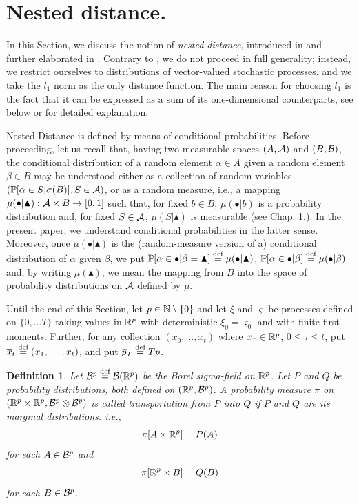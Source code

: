 \documentclass{article}              %
\newtheorem{definition}{Definition}
\begin{document}
\section{\label{sec:Nested}Nested distance.}

In this Section, we discuss the notion of {\em nested distance}, introduced
in \cite{pflug2012distance} and further elaborated in \cite{pflug2014multistage}.
Contrary to \cite{pflug2014multistage}, we do not proceed in full
generality; instead, we restrict ourselves to distributions of vector-valued
stochastic processes, and we take the $l_{1}$ norm as the only distance
function. The main reason for choosing $l_{1}$ is the fact that it can be expressed as a sum of its one-dimensional counterparts, see below or \cite{Smid09c} for detailed explanation.

Nested Distance is defined by means of conditional probabilities.
Before proceeding, let us recall that, having two measurable spaces $(A,\mathcal{A})$ and $(B,\mathcal{B})$, the conditional distribution of
a random element $\alpha\in A$ given a random element $\beta\in B$
may be understood either as a collection of random variables $(\mathbb{P}[\alpha\in S|\sigma(B)],S \in \mathcal{A})$, or as a random measure, i.e., a mapping $\mu(\bullet|\blacktriangle):\mathcal{A}\times B\rightarrow[0,1]$
such that, for fixed $b\in B$, $\mu(\bullet|b)$ is a probability
distribution and, for fixed $S\in\mathcal{A}$, $\mu(S|\blacktriangle)$ is
measurable (see \cite{Kallenberg02} Chap. 1.). In the present paper,
we understand conditional probabilities in the latter sense. Moreover, once
$\mu(\bullet|\blacktriangle)$ is the (random-measure version of a) conditional
distribution of $\alpha$ given $\beta$, we put $\mathbb{P}[\alpha\in\bullet|\beta=\blacktriangle]\stackrel{\text{\rm def}}{=}\mu(\bullet|\blacktriangle)$,
$\mathbb{P}[\alpha\in\bullet|\beta]\stackrel{\text{\rm def}}{=}\mu(\bullet|\beta)$ and, by writing
$\mu(\blacktriangle)$, we mean the mapping from $B$ into the
space of probability distributions on $\mathcal{A}$ defined by $\mu$.

Until the end of this Section, let $p\in\mathbb{N} \setminus \{0\}$ and let $\xi$ and $\varsigma$
be processes defined on $\{0,\dots T\}$ taking values in $\mathbb{R}^{p}$
with deterministic $\xi_{0}=\varsigma_{0}$  and with finite first
moments. Further, 
for any collection $(x_{0},\dots,x_{t})$ where $x_\tau \in \mathbb{R}^p$, $0\leq \tau \leq t$, put $\overline{x}_{t}\stackrel{\text{\rm def}}{=}(x_{1},\dots,x_{t})$, and put $\bar{p}_{T}\stackrel{\text{\rm def}}{=} Tp$.

\begin{definition} Let $\mathcal{B}^{p}\stackrel{\text{\rm def}}{=}\mathcal{B}(\mathbb{R}^{p})$ be the Borel
sigma-field on $\mathbb{R}^{p}$.
Let $P$ and $Q$ be probability distributions, both defined on $(\mathbb{R}^{p},\mathcal{B}^{p})$. A probability measure $\pi$ on $(\mathbb{R}^{p}\times\mathbb{R}^{p},\mathcal{B}^{p}\otimes\mathcal{B}^{p})$
is called \emph{transportation} from $P$ into $Q$ if $P$ and
$Q$ are its marginal distributions. i.e.,
\begin{equation}
\pi[A\times\mathbb{R}^{p}]=P(A)\label{eq:tpp}
\end{equation}
for each $A\in\mathcal{B}^{p}$ and 
\begin{equation}
\pi[\mathbb{R}^{p}\times B]=Q(B)\label{eq:tpq}
\end{equation}
for each $B\in\mathcal{B}^{p}$. 
\end{definition}
\end{document}
